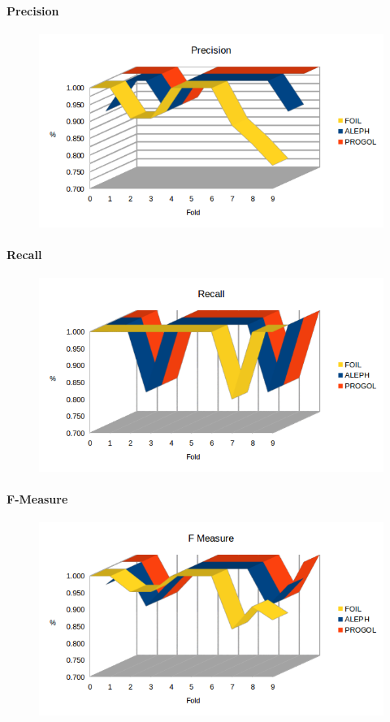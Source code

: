 \paragraph{Precision}
\begin{figure}[h!tbp]
	\includegraphics[width=1.2\textwidth]{img/datasetGraph/jmlr/precision.png}
	\label{JMLR-Precision}
\end{figure}
\paragraph{Recall}
\begin{figure}[h!tbp]
	\includegraphics[width=1.2\textwidth]{img/datasetGraph/jmlr/recall.png}
	\label{JMLR-Recall}
\end{figure}
\paragraph{F-Measure}
\begin{figure}[h!tbp]
	\includegraphics[width=1.2\textwidth]{img/datasetGraph/jmlr/fm.png}
	\label{JMLR-F-measure}
\end{figure}
